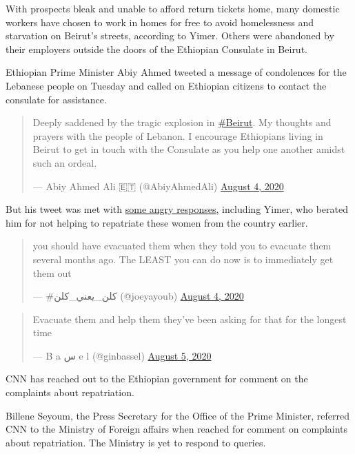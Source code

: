 With prospects bleak and unable to afford return tickets home, many
domestic workers have chosen to work in homes for free to avoid
homelessness and starvation on Beirut's streets, according to Yimer.
Others were abandoned by their employers outside the doors of the
Ethiopian Consulate in Beirut.

Ethiopian Prime Minister Abiy Ahmed tweeted a message of condolences for
the Lebanese people on Tuesday and called on Ethiopian citizens to
contact the consulate for assistance.

\begin{quote}
Deeply saddened by the tragic explosion in
\href{https://twitter.com/hashtag/Beirut?src=hash\&ref_src=twsrc\%5Etfw}{\#Beirut}.
My thoughts and prayers with the people of Lebanon. I encourage
Ethiopians living in Beirut to get in touch with the Consulate as you
help one another amidst such an ordeal.

--- Abiy Ahmed Ali 🇪🇹 (@AbiyAhmedAli)
\href{https://twitter.com/AbiyAhmedAli/status/1290739232538009602?ref_src=twsrc\%5Etfw}{August
4, 2020}
\end{quote}

But his tweet was met with
\href{https://twitter.com/ginbassel/status/1290867226162102272?s=20}{some
angry responses,} including Yimer, who berated him for not helping to
repatriate these women from the country earlier.

\begin{quote}
you should have evacuated them when they told you to evacuate them
several months ago. The LEAST you can do now is to immediately get them
out

--- \#كلن\_يعني\_كلن (@joeyayoub)
\href{https://twitter.com/joeyayoub/status/1290744608851460096?ref_src=twsrc\%5Etfw}{August
4, 2020}
\end{quote}

\begin{quote}
Evacuate them and help them they've been asking for that for the longest
time

--- B a س e l (@ginbassel)
\href{https://twitter.com/ginbassel/status/1290867226162102272?ref_src=twsrc\%5Etfw}{August
5, 2020}
\end{quote}

CNN has reached out to the Ethiopian government for comment on the
complaints about repatriation.

Billene Seyoum, the Press Secretary for the Office of the Prime
Minister, referred CNN to the Ministry of Foreign affairs when reached
for comment on complaints about repatriation. The Ministry is yet to
respond to queries.

